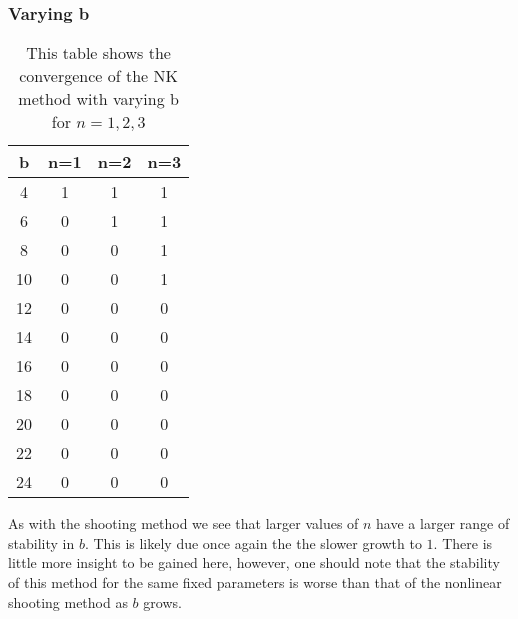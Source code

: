 \documentclass{article}
\begin{document}
\subsubsection{Varying b}
\begin{table}[H]
\centering
\begin{tabular}{|c|c|c|c|}
\hline
b & n=1 & n=2 & n=3\\
\hline
4  & 1 & 1 & 1\\
6  & 0 & 1 & 1\\
8  & 0 & 0 & 1\\
10 & 0 & 0 & 1\\
12 & 0 & 0 & 0\\
14 & 0 & 0 & 0\\
16 & 0 & 0 & 0\\
18 & 0 & 0 & 0\\
20 & 0 & 0 & 0\\
22 & 0 & 0 & 0\\
24 & 0 & 0 & 0\\
\hline
\end{tabular}
\caption{This table shows the convergence of the NK method with varying b for $n=1,2,3$}
\end{table}
As with the shooting method we see that larger values of $n$ have a larger range of stability in $b$. This is likely due once again the the slower growth to $1$. There is little more insight to be gained here, however, one should note that the stability of this method for the same fixed parameters is worse than that of the nonlinear shooting method as $b$ grows. 
\end{document}
